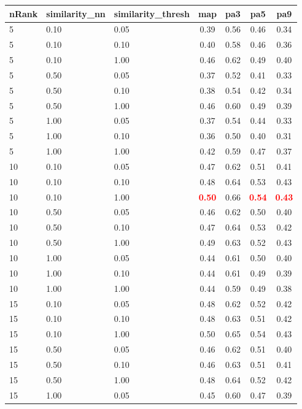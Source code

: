   
\begin{table} 
\begin{center} 
\scriptsize 
 \setlength{\tabcolsep}{.16667em} 
\begin{tabular}{lllcccc} 
nRank & similarity\_nn & similarity\_thresh & map & pa3 & pa5 & pa9 \\ 
\hline 
 5 & 0.10 & 0.05 & 0.39 & 0.56 & 0.46 & 0.34 \\ 
 5 & 0.10 & 0.10 & 0.40 & 0.58 & 0.46 & 0.36 \\ 
 5 & 0.10 & 1.00 & 0.46 & 0.62 & 0.49 & 0.40 \\ 
 5 & 0.50 & 0.05 & 0.37 & 0.52 & 0.41 & 0.33 \\ 
 5 & 0.50 & 0.10 & 0.38 & 0.54 & 0.42 & 0.34 \\ 
 5 & 0.50 & 1.00 & 0.46 & 0.60 & 0.49 & 0.39 \\ 
 5 & 1.00 & 0.05 & 0.37 & 0.54 & 0.44 & 0.33 \\ 
 5 & 1.00 & 0.10 & 0.36 & 0.50 & 0.40 & 0.31 \\ 
 5 & 1.00 & 1.00 & 0.42 & 0.59 & 0.47 & 0.37 \\ 
10 & 0.10 & 0.05 & 0.47 & 0.62 & 0.51 & 0.41 \\ 
10 & 0.10 & 0.10 & 0.48 & 0.64 & 0.53 & 0.43 \\ 
10 & 0.10 & 1.00 & \textbf{\textcolor{red}{0.50}} & 0.66 & \textbf{\textcolor{red}{0.54}} & \textbf{\textcolor{red}{0.43}} \\ 
10 & 0.50 & 0.05 & 0.46 & 0.62 & 0.50 & 0.40 \\ 
10 & 0.50 & 0.10 & 0.47 & 0.64 & 0.53 & 0.42 \\ 
10 & 0.50 & 1.00 & 0.49 & 0.63 & 0.52 & 0.43 \\ 
10 & 1.00 & 0.05 & 0.44 & 0.61 & 0.50 & 0.40 \\ 
10 & 1.00 & 0.10 & 0.44 & 0.61 & 0.49 & 0.39 \\ 
10 & 1.00 & 1.00 & 0.44 & 0.59 & 0.49 & 0.38 \\ 
15 & 0.10 & 0.05 & 0.48 & 0.62 & 0.52 & 0.42 \\ 
15 & 0.10 & 0.10 & 0.48 & 0.63 & 0.51 & 0.42 \\ 
15 & 0.10 & 1.00 & 0.50 & 0.65 & 0.54 & 0.43 \\ 
15 & 0.50 & 0.05 & 0.46 & 0.62 & 0.51 & 0.40 \\ 
15 & 0.50 & 0.10 & 0.46 & 0.63 & 0.51 & 0.41 \\ 
15 & 0.50 & 1.00 & 0.48 & 0.64 & 0.52 & 0.42 \\ 
15 & 1.00 & 0.05 & 0.45 & 0.60 & 0.47 & 0.39 \\ 

\end{tabular}
\end{center}
\end{table}
